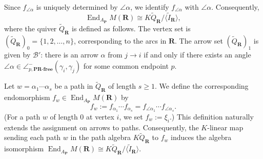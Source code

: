\documentclass[a4paper,10pt]{amsart}
\theoremstyle{plain}          %
\theoremstyle{definition}
\def\PP{\mathbf{P}}
\newcommand{\ha}{\angle^-}
\newcommand{\End}{\operatorname{End}\nolimits}
\begin{document}
Since $f_{\angle\alpha}$ is uniquely determined by $\angle\alpha$, we identify $f_{\angle\alpha}$ with $\angle\alpha$. %
 Consequently, $$\End_{A_{\PP}} M(\mathbf{R}) \cong K\widetilde{Q}_{\mathbf{R}}/\langle \widetilde{I}_{\mathbf{R}}\rangle,$$ 
where the quiver $\widetilde{Q}_{\mathbf{R}}$ is defined as follows. The vertex set is $(\widetilde{Q}_{\mathbf{R}})_0=\{1,2,\dots,n\}$, corresponding to the arcs in $\mathbf{R}$.
The arrow set $(\widetilde{Q}_{\mathbf{R}})_1$ is given by $\mathscr{B}'$: there is an arrow $\alpha$ from $j\to i$ if and only if there exists an angle $\angle\alpha\in\angle_{p,\textbf{PR-free}}^{-}(\gamma_i,\gamma_j)$ for some common endpoint $p$. 


Let $w = \alpha_1 \cdots \alpha_s$ be a path in $\widetilde{Q}_{\mathbf{R}}$ of length $s \ge 1$. 
We define the corresponding endomorphism $f_w \in \End_{A_{\PP}} M(\mathbf{R})$ by 
\[
f_w := f_{\alpha_1} \cdots f_{\alpha_s} = f_{\angle\alpha_1} \cdots f_{\angle\alpha_s}.
\]
(For a path $w$ of length $0$ at vertex $i$, we set $f_w := \xi_i$.) 
This definition naturally extends the assignment on arrows to paths. 
Consequently, the $K$-linear map sending each path $w$ in the path algebra $K\widetilde{Q}_{\mathbf{R}}$ to $f_w$ induces the algebra isomorphism $\End_{A_{\PP}} M(\mathbf{R}) \cong K\widetilde{Q}_{\mathbf{R}}/\langle \widetilde{I}_{\mathbf{R}}\rangle$.
\end{document}
